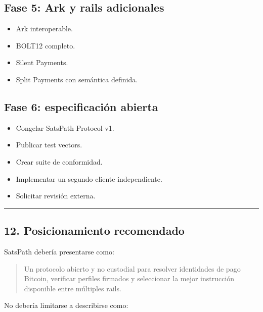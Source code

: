 \documentclass[
]{article}
\providecommand{\tightlist}{%
  \setlength{\itemsep}{0pt}\setlength{\parskip}{0pt}}
\begin{document}
\hypertarget{fase-5-ark-y-rails-adicionales}{%
\subsection{Fase 5: Ark y rails
adicionales}\label{fase-5-ark-y-rails-adicionales}}

\begin{itemize}
\tightlist
\item
  Ark interoperable.
\item
  BOLT12 completo.
\item
  Silent Payments.
\item
  Split Payments con semántica definida.
\end{itemize}

\hypertarget{fase-6-especificaciuxf3n-abierta}{%
\subsection{Fase 6: especificación
abierta}\label{fase-6-especificaciuxf3n-abierta}}

\begin{itemize}
\tightlist
\item
  Congelar SatsPath Protocol v1.
\item
  Publicar test vectors.
\item
  Crear suite de conformidad.
\item
  Implementar un segundo cliente independiente.
\item
  Solicitar revisión externa.
\end{itemize}

\begin{center}\rule{0.5\linewidth}{0.5pt}\end{center}

\hypertarget{posicionamiento-recomendado}{%
\subsection{12. Posicionamiento
recomendado}\label{posicionamiento-recomendado}}

SatsPath debería presentarse como:

\begin{quote}
Un protocolo abierto y no custodial para resolver identidades de pago
Bitcoin, verificar perfiles firmados y seleccionar la mejor instrucción
disponible entre múltiples rails.
\end{quote}

No debería limitarse a describirse como:
\end{document}
